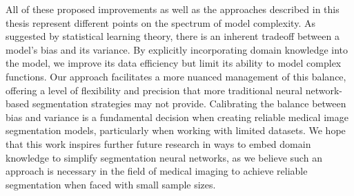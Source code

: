 All of these proposed improvements as well as the approaches described in this thesis represent different points on the spectrum of model complexity. As suggested by statistical learning theory, there is an inherent tradeoff between a model's bias and its variance. By explicitly incorporating domain knowledge into the model, we improve its data efficiency but limit its ability to model complex functions. Our approach facilitates a more nuanced management of this balance, offering a level of flexibility and precision that more traditional neural network-based segmentation strategies may not provide. Calibrating the balance between bias and variance is a fundamental decision when creating reliable medical image segmentation models, particularly when working with limited datasets. We hope that this work inspires further future research in ways to embed domain knowledge to simplify segmentation neural networks, as we believe such an approach is necessary in the field of medical imaging to achieve reliable segmentation when faced with small sample sizes.
